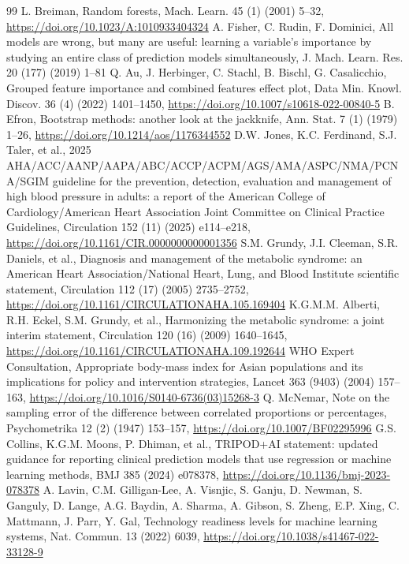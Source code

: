 \documentclass[final,5p,times,twocolumn]{elsarticle}
\begin{document}
\begin{thebibliography}{99}
 L. Breiman, Random forests, Mach. Learn. 45 (1) (2001) 5–32, \url{https://doi.org/10.1023/A:1010933404324}
 A. Fisher, C. Rudin, F. Dominici, All models are wrong, but many are useful: learning a variable's importance by studying an entire class of prediction models simultaneously, J. Mach. Learn. Res. 20 (177) (2019) 1–81
 Q. Au, J. Herbinger, C. Stachl, B. Bischl, G. Casalicchio, Grouped feature importance and combined features effect plot, Data Min. Knowl. Discov. 36 (4) (2022) 1401–1450, \url{https://doi.org/10.1007/s10618-022-00840-5}
 B. Efron, Bootstrap methods: another look at the jackknife, Ann. Stat. 7 (1) (1979) 1–26, \url{https://doi.org/10.1214/aos/1176344552}
 D.W. Jones, K.C. Ferdinand, S.J. Taler, et al., 2025 AHA/\allowbreak{}ACC/\allowbreak{}AANP/\allowbreak{}AAPA/\allowbreak{}ABC/\allowbreak{}ACCP/\allowbreak{}ACPM/\allowbreak{}AGS/\allowbreak{}AMA/\allowbreak{}ASPC/\allowbreak{}NMA/\allowbreak{}PCNA/\allowbreak{}SGIM guideline for the prevention, detection, evaluation and management of high blood pressure in adults: a report of the American College of Cardiology/\allowbreak{}American Heart Association Joint Committee on Clinical Practice Guidelines, Circulation 152 (11) (2025) e114–e218, \url{https://doi.org/10.1161/CIR.0000000000001356}
 S.M. Grundy, J.I. Cleeman, S.R. Daniels, et al., Diagnosis and management of the metabolic syndrome: an American Heart Association/\allowbreak{}National Heart, Lung, and Blood Institute scientific statement, Circulation 112 (17) (2005) 2735–2752, \url{https://doi.org/10.1161/CIRCULATIONAHA.105.169404}
 K.G.M.M. Alberti, R.H. Eckel, S.M. Grundy, et al., Harmonizing the metabolic syndrome: a joint interim statement, Circulation 120 (16) (2009) 1640–1645, \url{https://doi.org/10.1161/CIRCULATIONAHA.109.192644}
 WHO Expert Consultation, Appropriate body-mass index for Asian populations and its implications for policy and intervention strategies, Lancet 363 (9403) (2004) 157–163, \url{https://doi.org/10.1016/S0140-6736(03)15268-3}
 Q. McNemar, Note on the sampling error of the difference between correlated proportions or percentages, Psychometrika 12 (2) (1947) 153–157, \url{https://doi.org/10.1007/BF02295996}
 G.S. Collins, K.G.M. Moons, P. Dhiman, et al., TRIPOD+AI statement: updated guidance for reporting clinical prediction models that use regression or machine learning methods, BMJ 385 (2024) e078378, \url{https://doi.org/10.1136/bmj-2023-078378}
 A. Lavin, C.M. Gilligan-Lee, A. Visnjic, S. Ganju, D. Newman, S. Ganguly, D. Lange, A.G. Baydin, A. Sharma, A. Gibson, S. Zheng, E.P. Xing, C. Mattmann, J. Parr, Y. Gal, Technology readiness levels for machine learning systems, Nat. Commun. 13 (2022) 6039, \url{https://doi.org/10.1038/s41467-022-33128-9}

\end{thebibliography}
\end{document}
